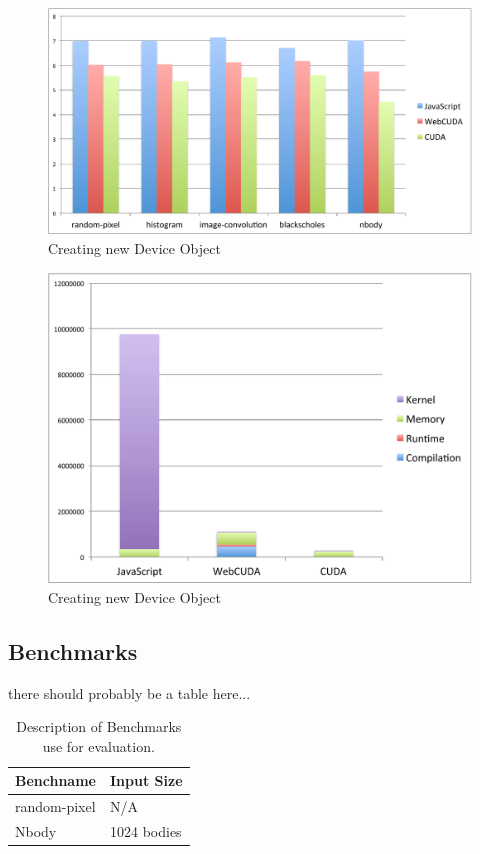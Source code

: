 
\begin{figure}
	\begin{center}
		\includegraphics[width=\columnwidth]{./figures/fig1}
	\end{center}
	\caption{Creating new \name Device Object}
	\label{fig1}
\end{figure}

\begin{figure}
	\begin{center}
		\includegraphics[width=\columnwidth]{./figures/fig2}
	\end{center}
	\caption{Creating new \name Device Object}
	\label{fig2}
\end{figure}

\subsection{Benchmarks}
there should probably be a table here...
\begin{table}
	\begin{center}
		\begin{tabular}{| l | l |}
			\hline
			Benchname & Input Size \\
			\hline
			random-pixel & N/A \\
			\hline
			Nbody &  1024 bodies \\
			\hline
		\end{tabular}
	\end{center}
	\caption{Description of Benchmarks use for evaluation.}
	\label{benchmark-table}
\end{table}

